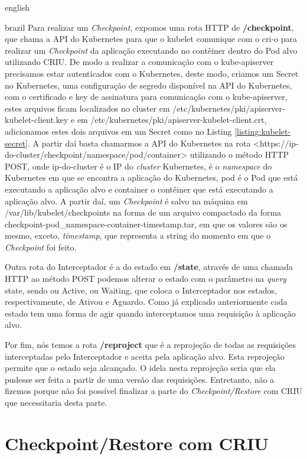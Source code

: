 \begin{otherlanguage*}{english}
\begin{otherlanguage*}{brazil}
Para realizar um \textit{Checkpoint}, expomos uma rota HTTP de \textbf{/checkpoint}, que
chama a API do Kubernetes para que o kubelet comunique com o cri-o para realizar um 
\textit{Checkpoint} da aplicação executando no contêiner dentro do Pod alvo utilizando
CRIU. De modo a realizar a comunicação com o kube-apiserver precisamos estar autenticados
com o Kubernetes, deste modo, criamos um Secret no Kubernetes, uma configuração de segredo
disponível na API do Kubernetes, com o certificado e key de assinatura para comunicação
com o kube-apiserver, estes arquivos ficam localizados no cluster em
/etc/kubernetes/pki/apiserver-kubelet-client.key e em
/etc/kubernetes/pki/apiserver-kubelet-client.crt, adicionamos estes dois arquivos em um
Secret como no Listing \ref{listing:kubelet-secret}. A partir daí basta chamarmos a API
do Kubernetes na rota <https://ip-do-cluster/checkpoint/namespace/pod/container>
utilizando o método HTTP POST, onde ip-do-cluster é o IP do \textit{cluster} Kubernetes,
é o \textit{namespace} do Kubernetes em que se encontra a aplicação do Kubernetes, pod é
o Pod que está executando a aplicação alvo e container o contêiner que está executando a
aplicação alvo. A partir daí, um \textit{Checkpoint} é salvo na máquina em
/var/lib/kubelet/checkpoints na forma de um arquivo compactado da forma
checkpoint-pod\_namespace-container-timestamp.tar, em que os valores são os mesmo,
exceto, \textit{timestamp}, que representa a string do momento em que o \textit{Checkpoint}
foi feito.


Outra rota do Interceptador é a do estado em \textbf{/state}, através de uma chamada
HTTP ao método POST podemos alterar o estado com o parâmetro na \textit{query} state,
sendo ou Active, ou Waiting, que coloca o Interceptador nos estados, respectivamente,
de Ativou e Aguardo. Como já explicado anteriormente cada estado tem uma forma de agir
quando interceptamos uma requisição à aplicação alvo.

Por fim, nós temos a rota \textbf{/reproject} que é a reprojeção de todas as requisições
interceptadas pelo Interceptador e aceita pela aplicação alvo. Esta reprojeção permite
que o estado seja alcançado. O idela nesta reprojeção seria que ela pudesse ser feita a
partir de uma versão das requisições. Entretanto, não a fizemos porque não foi possível
finalizar a parte do \textit{Checkpoint/Restore} com CRIU que necessitaria desta parte.

\section{Checkpoint/Restore com CRIU}


\end{otherlanguage*}
\end{otherlanguage*}
